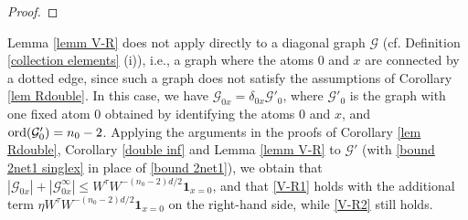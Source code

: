 \documentclass{article}
\newcommand{\1}{\mathds{1}}
\numberwithin{equation}{section}
\newcommand{\ord}{{\rm{ord}}}
\newcommand{\al}{\alpha}
\newcommand{\be}{\begin{equation}}
\newcommand{\ee}{\end{equation}}
\renewcommand{\cal}{\mathcal}
\newcommand{\wh}{\widehat}
\renewcommand{\leq}{\leqslant}
\renewcommand{\geq}{\geqslant}
\renewcommand{\le}{\leq}
\renewcommand{\ge}{\geq}
\theoremstyle{plain} %
\theoremstyle{remark}
\begin{document}
\begin{proof}
\end{proof}

Lemma \ref{lemm V-R} does not apply directly to a diagonal graph $\cal G$ (cf. Definition \ref{collection elements} (i)), i.e., a graph where the atoms $0$ and $x$ are connected by a dotted edge, since such a graph does not satisfy the assumptions of Corollary \ref{lem Rdouble}. In this case, we have $\cal G_{0x}=\delta_{0x}\cal G'_0$, where $\cal G'_0$ is the graph with one fixed atom $0$ obtained by identifying the atoms $0$ and $x$, and $\ord(\cal G'_0)=n_0-2$. Applying the arguments in the proofs of Corollary \ref{lem Rdouble}, Corollary \ref{double inf} and Lemma \ref{lemm V-R} to $\cal G'$ (with \eqref{bound 2net1 singlex} in place of \eqref{bound 2net1}), we obtain that $|\cal G_{0x}|+|\cal G^\infty_{0x}|\le W^{\tau}W^{-(n_0-2)d/2}\mathbf 1_{x=0}$, and that \eqref{V-R1} holds with the additional term $\eta W^{\tau}W^{-(n_0-2)d/2}\mathbf 1_{x=0}$ on the right-hand side, while \eqref{V-R2} still holds.
\end{document}
